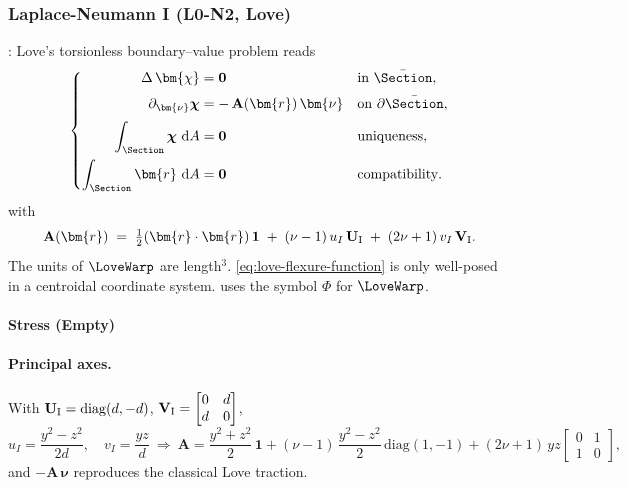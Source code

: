 \subsubsection{Laplace-Neumann I (L0-N2, Love)}
\cite[Art. 229]{love1944treatise}:
Love’s torsionless boundary–value problem reads
\begin{equation}
\left\{
\begin{aligned}
\Delta\,\bm{\chi}&=\mathbf{0} &&\text{in }\bar{\Section},\\[2pt]
\partial_{\bm{\nu}}\boldsymbol{\chi}&= -\,\mathbf A(\bm{r})\,\bm{\nu}
&&\text{on }\partial\bar{\Section},\\[2pt]
\displaystyle\int_{\Section}\boldsymbol{\chi}\mathrm{~d}A&=\mathbf{0} &&\text{uniqueness}, \\
\int_{\Section}\bm{r}\mathrm{~d}A&=\mathbf{0} &&\text{compatibility}.
\end{aligned}
\right.
\label{eq:love-flexure-function}
\end{equation}
with
\begin{equation}
\mathbf A(\bm{r})\;=\;\tfrac12(\bm{r}\cdot\bm{r})\,\mathbf{1}
\;+\;(\nu-1)\,u_I\,\mathbf{U}_{\rm I}
\;+\;(2\nu+1)\,v_I\,\mathbf{V}_{\rm I}.
\end{equation}
The units of \(\LoveWarp\) are length$^3$. 
\eqref{eq:love-flexure-function} is only well-posed in a centroidal coordinate system. \cite{sokolnikoffMathematicalTheoryElasticity1946} uses the symbol \(\Phi\) for \(\LoveWarp\).

\paragraph{Stress (Empty)}

\paragraph{Principal axes.}
With $\mathbf{U}_{\rm I}=\mathrm{diag}(d,-d)$, $\mathbf{V}_{\rm I}=\begin{bmatrix}0&d\\ d&0\end{bmatrix}$,
\[
u_I=\frac{y^2-z^2}{2d},\quad v_I=\frac{yz}{d}
\ \Longrightarrow\
\mathbf A
=\frac{y^2+z^2}{2}\,\mathbf{1}
+(\nu-1)\,\frac{y^2-z^2}{2}\,\mathrm{diag}(1,-1)
+(2\nu+1)\,yz
\begin{bmatrix}0&1\\[2pt]1&0\end{bmatrix},
\]
and $-\mathbf A\,\bm{\nu}$ reproduces the classical Love traction.

